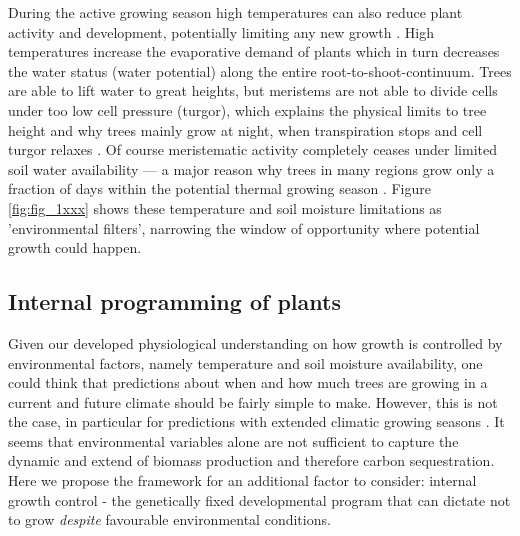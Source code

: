 \documentclass{article}
\begin{document}
		During the active growing season high temperatures can also reduce plant activity and development, potentially limiting any new growth \citep{osullivanThermalLimitsLeaf2017}. High temperatures increase the evaporative demand of plants which in turn decreases the water status (water potential) along the entire root-to-shoot-continuum. Trees are able to lift water to great heights, but meristems are not able to divide cells under too low cell pressure (turgor), which explains the physical limits to tree height \citep{kochLimitsTreeHeight2004} and why trees mainly grow at night, when transpiration stops and cell turgor relaxes \citep{zweifelWhyTreesGrow2021}. Of course meristematic activity completely ceases under limited soil water availability --- a major reason why trees in many regions grow only  a fraction of days within the potential thermal growing season \citep{etzoldNumberGrowthDays2021}. Figure \ref{fig:fig_1xxx} shows these temperature and soil moisture limitations as 'environmental filters', narrowing the window of opportunity where potential growth could happen. \\
		
		\subsection*{Internal programming of plants}
		Given our developed physiological understanding on how growth is controlled by environmental factors, namely temperature and soil moisture availability, one could think that predictions about when and how much trees are growing in a current and future climate should be fairly simple to make. However, this is not the case, in particular for predictions with extended climatic growing seasons \citep{zohnerHowChangesSpring2021}. It seems that environmental variables alone are not sufficient to capture the dynamic and extend of biomass production and therefore carbon sequestration.  Here we propose the framework for an additional factor to consider: internal growth control - the genetically fixed developmental program that can dictate not to grow \textit{despite} favourable environmental conditions.\\
		
\end{document}

